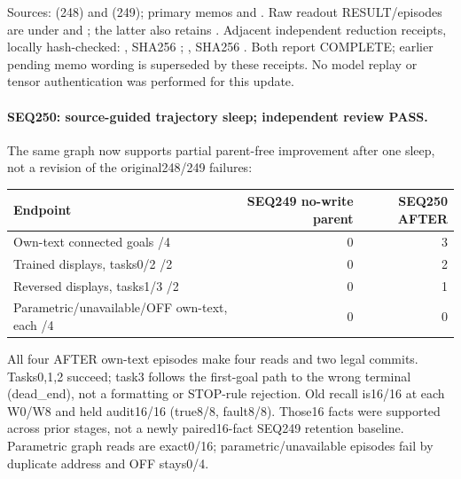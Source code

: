 \documentclass[11pt]{article}
\begin{document}
Sources:  (248) and
 (249); primary memos
 and
.
Raw readout RESULT/episodes are under
and ;
the latter also retains .
Adjacent independent reduction receipts, locally hash-checked:
, SHA256
;
, SHA256
.
Both report COMPLETE; earlier pending memo wording is superseded by these
receipts. No model replay or tensor authentication was performed for this update.

\paragraph{SEQ250: source-guided trajectory sleep; independent review PASS.}
The same graph now supports partial parent-free improvement after one sleep,
not a revision of the original248/249 failures:
\begin{center}
\small
\begin{tabular}{lrr}
\toprule
Endpoint & SEQ249 no-write parent & SEQ250 AFTER \\
\midrule
Own-text connected goals /4 & 0 & 3 \\
Trained displays, tasks0/2 /2 & 0 & 2 \\
Reversed displays, tasks1/3 /2 & 0 & 1 \\
Parametric/unavailable/OFF own-text, each /4 & 0 & 0 \\
\bottomrule
\end{tabular}
\end{center}
All four AFTER own-text episodes make four reads and two legal commits.
Tasks0,1,2 succeed; task3 follows the first-goal path to the wrong terminal
(dead\_end), not a formatting or STOP-rule rejection. Old recall is16/16 at
each W0/W8 and held audit16/16 (true8/8, fault8/8). Those16 facts were supported
across prior stages, not a newly paired16-fact SEQ249 retention baseline.
Parametric graph reads are exact0/16; parametric/unavailable episodes fail by
duplicate address and OFF stays0/4.
\end{document}
